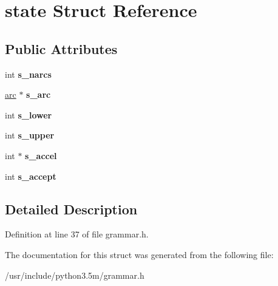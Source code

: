 \hypertarget{structstate}{}\section{state Struct Reference}
\label{structstate}
\subsection*{Public Attributes}
\begin{DoxyCompactItemize}
\item 
int {\bfseries s\+\_\+narcs}\hypertarget{structstate_ab40e0d7dcf6279c8d580b10c43c52bea}{}\label{structstate_ab40e0d7dcf6279c8d580b10c43c52bea}

\item 
\hyperlink{structarc}{arc} $\ast$ {\bfseries s\+\_\+arc}\hypertarget{structstate_a48dd0737c713d022f0a325bcf00720ac}{}\label{structstate_a48dd0737c713d022f0a325bcf00720ac}

\item 
int {\bfseries s\+\_\+lower}\hypertarget{structstate_ac0e13c561d230dd73c96ae092fc8327d}{}\label{structstate_ac0e13c561d230dd73c96ae092fc8327d}

\item 
int {\bfseries s\+\_\+upper}\hypertarget{structstate_a2adaa9bfb5e4b5a4d6e5cf18eb45b35a}{}\label{structstate_a2adaa9bfb5e4b5a4d6e5cf18eb45b35a}

\item 
int $\ast$ {\bfseries s\+\_\+accel}\hypertarget{structstate_adf0ca868ccf8aca5d98eef3fa333db3d}{}\label{structstate_adf0ca868ccf8aca5d98eef3fa333db3d}

\item 
int {\bfseries s\+\_\+accept}\hypertarget{structstate_a11c378b4839835db24f1b9be3785e6fb}{}\label{structstate_a11c378b4839835db24f1b9be3785e6fb}

\end{DoxyCompactItemize}


\subsection{Detailed Description}


Definition at line 37 of file grammar.\+h.



The documentation for this struct was generated from the following file\+:\begin{DoxyCompactItemize}
\item 
/usr/include/python3.\+5m/grammar.\+h\end{DoxyCompactItemize}

